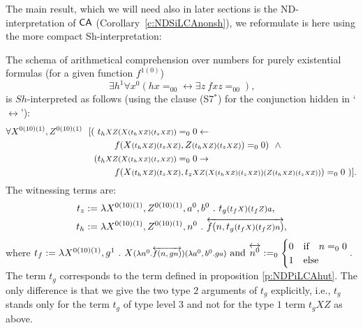 The main result, which we will need also in later sections is the ND-interpretation of $\textsf{\upshape CA}$ (Corollary~\ref{c:NDSiLCAnonsh}), we reformulate is here using the more compact Sh-interpretation:
\begin{thm}\label{c:NDSiLCA}
  The schema of arithmetical comprehension over numbers for purely existential
  formulas (for a given function $f^{1(0)}$)
  \[
  \exists h^1\forall x^0 (hx=_00 \leftrightarrow \exists z\ fxz=_00)\text{,}
  \]
is $Sh$-interpreted as follows (using the clause (S7$^*$) for the 
conjunction hidden in `$\leftrightarrow$'):
\begin{align*}
  \forall X^{\typeOfXZ},Z^{\typeOfXZ}\ \ [(\ 
t_h&\args{XZ(X\args{(t_h\args{XZ})(t_z\args{XZ})})}=_00
        \leftarrow \\
        & \quad f(X \args{(t_h\args{XZ})(t_z\args{XZ})}, 
                  Z \args{(t_h\args{XZ})(t_z\args{XZ})} ) =_00)\ \ \wedge\\
 (t_h&\args{XZ(X\args{(t_h\args{XZ})(t_z\args{XZ})})}=_00 
         \rightarrow \\
     &\quad f (
           X\args{(t_h\args{XZ})(t_z\args{XZ})}, 
           t_{z}\args{XZ (X\args{(t_h\args{XZ})(t_z\args{XZ})})
                      (Z\args{(t_h\args{XZ})(t_z\args{XZ})}) } 
      ) =_00\ )]
\text{.}
\end{align*}
The witnessing terms are:
\begin{align*}
t_z&:=\lambda X^{\typeOfXZ},Z^{\typeOfXZ},a^0,b^0\ .\ t_g\args{(t_f\args{X})
(t_f\args{Z})a}\text{,}\\
t_h&:=\lambda X^{\typeOfXZ},Z^{\typeOfXZ},n^0\ .\ 
 \overleftrightarrow{f(n,t_g\args{(t_f\args X)(t_f\args Z)n})}
\text{,}
\end{align*}
where
$
t_f:=\lambda X^{\typeOfXZ},g^1\ .\ 
  X \args{ (\lambda n^0.\overleftrightarrow{f(n,g\args{n})})
(\lambda a^0,b^0 . g\args{a}) }
\text{ and }
\overleftrightarrow{n^0}:=_0\begin{cases}0&\Tif\quad n=_00\\1&\Telse\end{cases}
\text{.}
$\\
The term $t_g$ corresponds to the term
defined in proposition \ref{p:NDPiLCAhut}. The only difference is that 
we give the two type $2$ arguments of $t_g$ explicitly, i.e.,
$t_g$ stands only for the term $t_g$ of type level $3$ and not for 
the type $1$ term $t_gXZ$ as above.
\end{thm}







